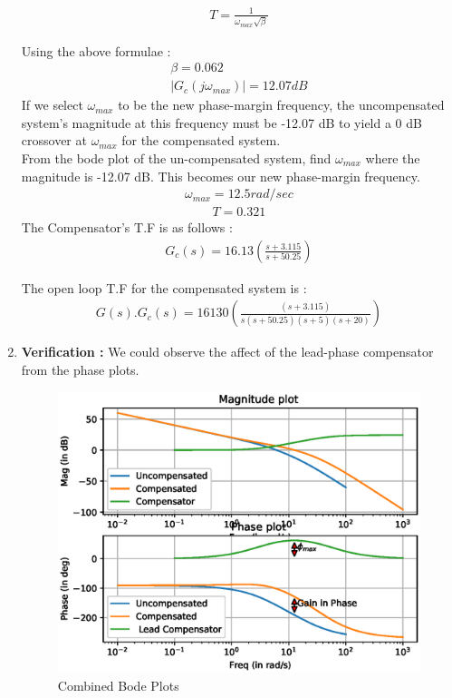 \begin{enumerate}[label=\thesubsection.\arabic*.,ref=\thesubsection.\theenumi]
\begin{align}
    T = \frac{1}{\omega_{max}\sqrt{\beta}}
\end{align}

Using the above formulae :
\begin{align}
    \beta = 0.062\\
    |G_{c}(j\omega_{max})| = 12.07 dB
\end{align}
If we select $\omega_{max}$ to be the new phase-margin frequency, the uncompensated system’s magnitude at this frequency must be -12.07 dB to yield a  0 dB crossover at $\omega_{max}$ for the compensated system.\\
From the bode plot of the un-compensated system, find $\omega_{max}$ where the magnitude is -12.07 dB. This becomes our new phase-margin frequency.
\begin{align}
\omega_{max} = 12.5 rad/sec
\end{align}
\begin{align}
T = 0.321
\end{align}
The Compensator's T.F is as follows :
\begin{align}
G_{c}(s) = 16.13\left(\frac{s + 3.115}{s + 50.25}\right)
\end{align}

The open loop T.F for the compensated system is  :
\begin{align}
    G(s).G_{c}(s) = 16130\left(\frac{(s+3.115)}{s(s+50.25)(s+5)(s+20)}\right)
\end{align}
\item
\textbf{Verification : }
We could observe the  affect of the lead-phase compensator from the phase plots.\\
\begin{figure}[!h]
    \centering
    \includegraphics[width=\columnwidth]{./figs/ee18btech11026/ee18btech11026_2.eps}
    \caption{Combined Bode Plots}
    \label{fig:ee18btech11026_2}
\end{figure}



\end{enumerate}
